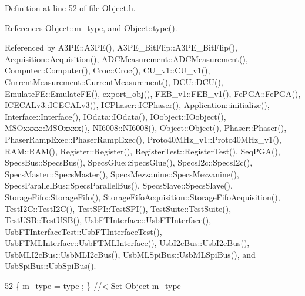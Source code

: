Definition at line 52 of file Object.\+h.



References Object\+::m\+\_\+type, and Object\+::type().



Referenced by A3\+P\+E\+::\+A3\+P\+E(), A3\+P\+E\+\_\+\+Bit\+Flip\+::\+A3\+P\+E\+\_\+\+Bit\+Flip(), Acquisition\+::\+Acquisition(), A\+D\+C\+Measurement\+::\+A\+D\+C\+Measurement(), Computer\+::\+Computer(), Croc\+::\+Croc(), C\+U\+\_\+v1\+::\+C\+U\+\_\+v1(), Current\+Measurement\+::\+Current\+Measurement(), D\+C\+U\+::\+D\+C\+U(), Emulate\+F\+E\+::\+Emulate\+F\+E(), export\+\_\+obj(), F\+E\+B\+\_\+v1\+::\+F\+E\+B\+\_\+v1(), Fe\+P\+G\+A\+::\+Fe\+P\+G\+A(), I\+C\+E\+C\+A\+Lv3\+::\+I\+C\+E\+C\+A\+Lv3(), I\+C\+Phaser\+::\+I\+C\+Phaser(), Application\+::initialize(), Interface\+::\+Interface(), I\+Odata\+::\+I\+Odata(), I\+Oobject\+::\+I\+Oobject(), M\+S\+Oxxxx\+::\+M\+S\+Oxxxx(), N\+I6008\+::\+N\+I6008(), Object\+::\+Object(), Phaser\+::\+Phaser(), Phaser\+Ramp\+Exec\+::\+Phaser\+Ramp\+Exec(), Proto40\+M\+Hz\+\_\+v1\+::\+Proto40\+M\+Hz\+\_\+v1(), R\+A\+M\+::\+R\+A\+M(), Register\+::\+Register(), Register\+Test\+::\+Register\+Test(), Seq\+P\+G\+A(), Specs\+Bus\+::\+Specs\+Bus(), Specs\+Glue\+::\+Specs\+Glue(), Specs\+I2c\+::\+Specs\+I2c(), Specs\+Master\+::\+Specs\+Master(), Specs\+Mezzanine\+::\+Specs\+Mezzanine(), Specs\+Parallel\+Bus\+::\+Specs\+Parallel\+Bus(), Specs\+Slave\+::\+Specs\+Slave(), Storage\+Fifo\+::\+Storage\+Fifo(), Storage\+Fifo\+Acquisition\+::\+Storage\+Fifo\+Acquisition(), Test\+I2\+C\+::\+Test\+I2\+C(), Test\+S\+P\+I\+::\+Test\+S\+P\+I(), Test\+Suite\+::\+Test\+Suite(), Test\+U\+S\+B\+::\+Test\+U\+S\+B(), Usb\+F\+T\+Interface\+::\+Usb\+F\+T\+Interface(), Usb\+F\+T\+Interface\+Test\+::\+Usb\+F\+T\+Interface\+Test(), Usb\+F\+T\+M\+L\+Interface\+::\+Usb\+F\+T\+M\+L\+Interface(), Usb\+I2c\+Bus\+::\+Usb\+I2c\+Bus(), Usb\+M\+L\+I2c\+Bus\+::\+Usb\+M\+L\+I2c\+Bus(), Usb\+M\+L\+Spi\+Bus\+::\+Usb\+M\+L\+Spi\+Bus(), and Usb\+Spi\+Bus\+::\+Usb\+Spi\+Bus().


\begin{DoxyCode}
52 \{ \hyperlink{classObject_a457a600fe8c00eb1034374f75110a78c}{m\_type}  = \hyperlink{classObject_a84f99f70f144a83e1582d1d0f84e4e62}{type}  ; \} \textcolor{comment}{//< Set Object m\_type}
\end{DoxyCode}
\mbox{\label{classSeqPGA_a83598ab914c8e3ee5afa34c5e6e7fdf4}} 

